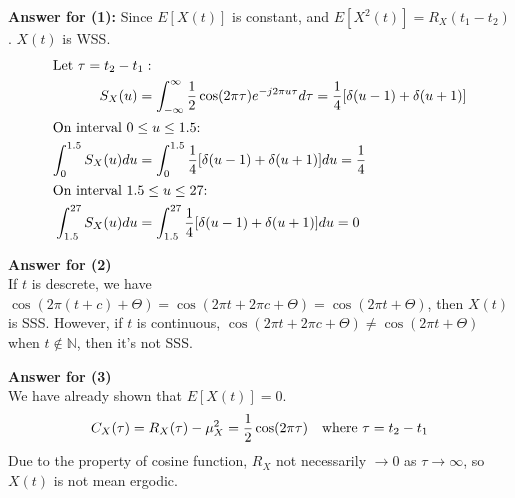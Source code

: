   \textbf{Answer for (1):}
  Since $E[X(t)]$ is constant, and $E[X^2(t)] = R_X(t_1 - t_2)$. $X(t)$ is WSS.
  \begin{align*}
    \shortintertext{Let $\tau = t_2 - t_1:$}
    S_X(u) & = \int_{-\infty}^{\infty} \dfrac{1}{2}\cos(2\pi \tau) e^{-j 2\pi u \tau} d \tau
             = \dfrac{1}{4}[\delta(u - 1) + \delta(u + 1)] \\
    \shortintertext{On interval $0\leq u \leq 1.5$:}
    \int_{0}^{1.5}S_X(u) du & = \int_{0}^{1.5} \dfrac{1}{4}[\delta(u - 1) + \delta(u + 1)] du = \dfrac{1}{4} \\
    \shortintertext{On interval $1.5\leq u \leq 27$:}
    \int_{1.5}^{27}S_X(u) du & = \int_{1.5}^{27} \dfrac{1}{4}[\delta(u - 1) + \delta(u + 1)] du = 0
  \end{align*}

  \textbf{Answer for (2)}\\
  If $t$ is descrete, we have $\cos(2 \pi (t + c) + \Theta) = \cos(2 \pi t + 2 \pi c + \Theta) = \cos(2 \pi t + \Theta)$,
  then $X(t)$ is SSS. However, if $t$ is continuous,
  $\cos(2 \pi t + 2 \pi c + \Theta) \not = \cos(2 \pi t + \Theta)$ when $t \not \in \mathbb{N}$, then it's not SSS.


  \textbf{Answer for (3)}\\
  We have already shown that $E[X(t)] = 0$.
  \begin{align*}
    C_X(\tau) & = R_X(\tau) - \mu_X^2 = \dfrac{1}{2}\cos(2 \pi \tau) & \text{where } \tau = t_2 - t_1
  \end{align*}
  Due to the property of cosine function, $R_X$ not necessarily $\rightarrow 0$ as $\tau \rightarrow \infty$,
  so $X(t)$ is not mean ergodic.